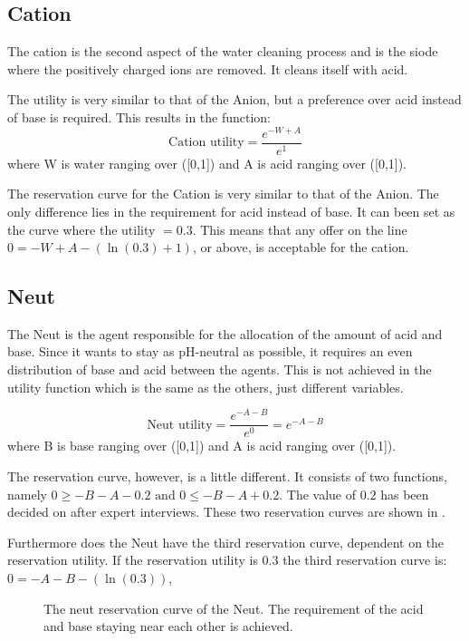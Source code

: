 \subsection{Cation}
The cation is the second aspect of the water cleaning process and is the siode where the positively charged ions are removed. It cleans itself with acid. %

The utility is very similar to that of the Anion, but a preference over acid instead of base is required. This results in the function:
\[
\text{Cation utility} = \frac{e^{-W+A}}{e^1}
\] 
where W is water ranging over ([0,1]) and A is acid ranging over ([0,1]).

The reservation curve for the Cation is very similar to that of the Anion. The only difference lies in the requirement for acid instead of base. It can been set as the curve where the utility $= 0.3$. This means that any offer on the line $0 = - W +A - (\ln(0.3)+1)$, or above, is acceptable for the cation.

\subsection{Neut}
The Neut is the agent responsible for the allocation of the amount of acid and base. Since it wants to stay as pH-neutral as possible, it requires an even distribution of base and acid between the agents. This is not achieved in the utility function which is the same as the others, just different variables.

\[
\text{Neut utility} = \frac{e^{-A-B}}{e^0} = e^{-A-B}
\] 
where B is base ranging over ([0,1]) and A is acid ranging over ([0,1]).

The reservation curve, however, is a little different. It consists of two functions, namely $0 \geq -B - A - 0.2 \text{ and }  0 \leq -B - A + 0.2$. The value of $0.2$ has been decided on after expert interviews. These two reservation curves are shown in .

Furthermore does the Neut have the third reservation curve, dependent on the reservation utility. If the reservation utility is $0.3$ the third reservation curve is: $0 = - A - B - (\ln(0.3))$,

\begin{figure}[h]
		\centering
			\caption{The neut reservation curve of the Neut. The requirement of the acid and base staying near each other is achieved.}
			\label{fig:neutreservationcurve}
	\end{figure}

